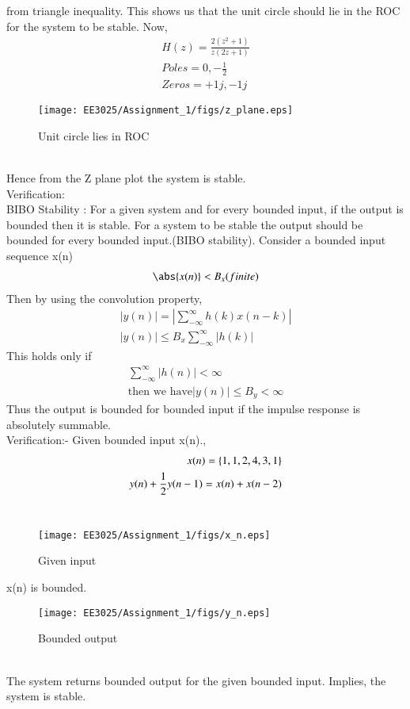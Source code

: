 \documentclass[journal,12pt,twocolumn]{IEEEtran}
\begin{document}
from triangle inequality. This shows us that the unit circle should lie in the ROC for the system to be stable. Now,
\begin{align}
H(z) = \frac{2(z^2+1)}{z(2z+1)} \\
Poles = 0 , -\frac{1}{2} \\
Zeros = +1j, -1j
\end{align}
\begin{figure}[h!]
    \centering
    \texttt{[image: EE3025/Assignment\_1/figs/z\_plane.eps]}
    \caption{Unit circle lies in ROC}
    \label{zn}
\end{figure} \\
Hence from the Z plane plot the system is stable.\\
Verification:\\
BIBO Stability : For a given system and for every bounded input, if the output is bounded then it is stable. 
For a system to be stable the output should be bounded for every bounded input.(BIBO stability).
Consider a bounded input sequence x(n) 
\begin{align}
\abs{x(n)}<B_x(finite)
\end{align}
Then by using the convolution property,
\begin{align}
 |y(n)|= |\sum_{-\infty}^{\infty}h(k)x(n-k)|\\
 |y(n)| \leq B_x\sum_{-\infty}^{\infty}|h(k)|
\end{align}
 This holds only if
\begin{align}
\sum_{-\infty}^{\infty}|{h(n)}| < 
\infty \\
\text{then we have} |{y(n)}| \leq B_y < \infty 
\end{align}
Thus the output is bounded for bounded input if the impulse response is absolutely summable.\\
Verification:- Given bounded input x(n).,
\begin{align}
x(n) = \left\{1,1,2,4,3,1\right\}\\
y(n)+\frac{1}{2}y(n-1) = x(n)+x(n-2)
\end{align} \\
\begin{figure}[h!]
    \centering
    \texttt{[image: EE3025/Assignment\_1/figs/x\_n.eps]}
    \caption{Given input}
    \label{xn}
\end{figure}
x(n) is bounded.\\
\begin{figure}[h!]
    \centering
    \texttt{[image: EE3025/Assignment\_1/figs/y\_n.eps]}
    \caption{Bounded output}
    \label{yn}
\end{figure} \\
The system returns bounded output for the given bounded input. Implies, the system is stable.\\ 
\end{document}
